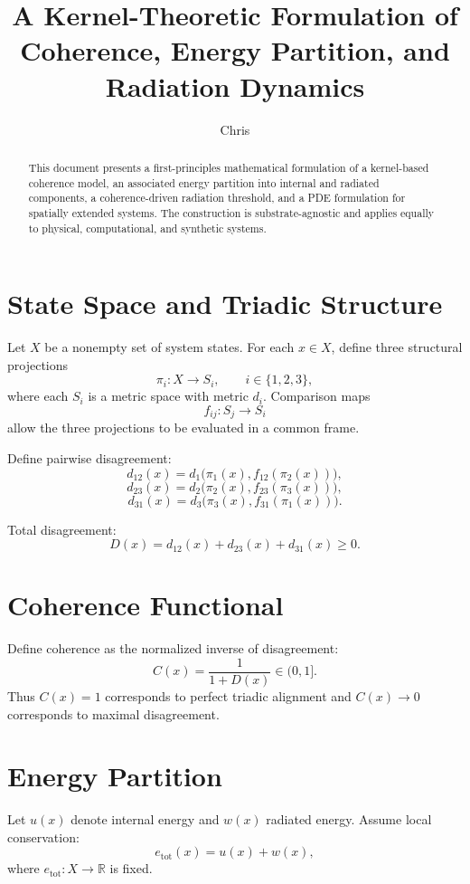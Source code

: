 \documentclass[11pt]{article}
\title{A Kernel-Theoretic Formulation of Coherence, Energy Partition, and Radiation Dynamics}
\author{Chris}
\date{}
\begin{document}
\maketitle

\begin{abstract}
This document presents a first-principles mathematical formulation of a kernel-based coherence model, an associated energy partition into internal and radiated components, a coherence-driven radiation threshold, and a PDE formulation for spatially extended systems. The construction is substrate-agnostic and applies equally to physical, computational, and synthetic systems.
\end{abstract}

\section{State Space and Triadic Structure}

Let $X$ be a nonempty set of system states.  
For each $x \in X$, define three structural projections
\[
\pi_i : X \to S_i, \qquad i \in \{1,2,3\},
\]
where each $S_i$ is a metric space with metric $d_i$.
Comparison maps
\[
f_{ij} : S_j \to S_i
\]
allow the three projections to be evaluated in a common frame.

Define pairwise disagreement:
\[
d_{12}(x) = d_1\big(\pi_1(x), f_{12}(\pi_2(x))\big),
\]
\[
d_{23}(x) = d_2\big(\pi_2(x), f_{23}(\pi_3(x))\big),
\]
\[
d_{31}(x) = d_3\big(\pi_3(x), f_{31}(\pi_1(x))\big).
\]

Total disagreement:
\[
D(x) = d_{12}(x) + d_{23}(x) + d_{31}(x) \ge 0.
\]

\section{Coherence Functional}

Define coherence as the normalized inverse of disagreement:
\[
C(x) = \frac{1}{1 + D(x)} \in (0,1].
\]
Thus $C(x) = 1$ corresponds to perfect triadic alignment and $C(x) \to 0$ corresponds to maximal disagreement.

\section{Energy Partition}

Let $u(x)$ denote internal energy and $w(x)$ radiated energy.  
Assume local conservation:
\[
e_{\mathrm{tot}}(x) = u(x) + w(x),
\]
where $e_{\mathrm{tot}} : X \to \mathbb{R}$ is fixed.
\end{document}
